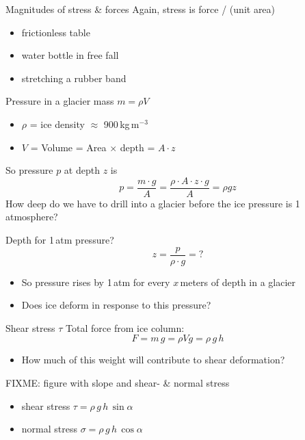 \documentclass[hide notes,intlimits]{beamer}
\begin{document}
\begin{frame}{Magnitudes of stress \& forces}
  Again, stress is force / (unit area)
     \begin{itemize}
      \item frictionless table
      \item water bottle in free fall
      \item stretching a rubber band
      \end{itemize}
\end{frame}

\begin{frame}{Pressure in a glacier}
  mass $m = \rho V$
     \begin{itemize}
      \item $\rho$ = ice density $\approx$ 900\,kg\,m$^{-3}$
      \item$V$ = Volume = Area $\times$ depth = $A \cdot z$
     \end{itemize}
     So pressure $p$ at depth $z$ is
     \begin{displaymath}
       p = \frac{m \cdot g}{A} = \frac{\rho \cdot A \cdot z \cdot g}{A} = \rho g z
     \end{displaymath}
     How deep do we have to drill into a glacier before the ice pressure is 1 atmosphere?
\end{frame}


\begin{frame}{Depth for 1\,atm pressure?}
    \begin{displaymath}
       z = \frac{p}{\rho\cdot g} = ?
     \end{displaymath}
     \begin{itemize}
     \item  So pressure rises by 1\,atm for every \alert{$x$}\,meters of depth in a glacier
     \item Does ice deform in response to this pressure?
     \end{itemize}
\end{frame}


\begin{frame}{Shear stress $\tau$}
  Total force from ice column:
    \begin{displaymath}
       F = m\,g = \rho V g = \rho\,g\,h
     \end{displaymath}
     \begin{itemize}
     \item How much of this weight will contribute to shear deformation?
    \end{itemize}
    FIXME: figure with slope and shear- \& normal stress
    \begin{itemize}
     \item shear stress $\tau = \rho\,g\,h\,\sin{\alpha}$
     \item normal stress $\sigma = \rho\,g\,h\,\cos{\alpha}$
    \end{itemize}
\end{frame}
\end{document}

